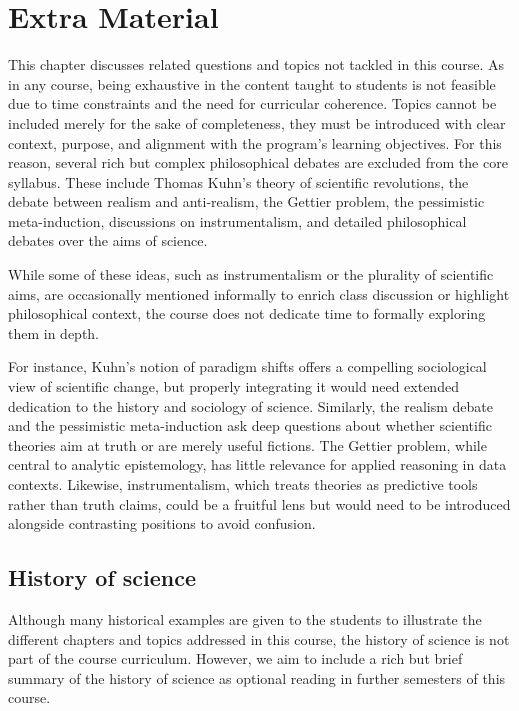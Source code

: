 \documentclass[
  12pt,
]{book}
\begin{document}
\chapter{Extra Material}\label{wont-fix}

This chapter discusses related questions and topics not tackled in this course. As in any course, being exhaustive in the content taught to students is not feasible due to time constraints and the need for curricular coherence. Topics cannot be included merely for the sake of completeness, they must be introduced with clear context, purpose, and alignment with the program's learning objectives. For this reason, several rich but complex philosophical debates are excluded from the core syllabus. These include Thomas Kuhn's theory of scientific revolutions, the debate between realism and anti-realism, the Gettier problem, the pessimistic meta-induction, discussions on instrumentalism, and detailed philosophical debates over the aims of science.

While some of these ideas, such as instrumentalism or the plurality of scientific aims, are occasionally mentioned informally to enrich class discussion or highlight philosophical context, the course does not dedicate time to formally exploring them in depth.

For instance, Kuhn's notion of paradigm shifts offers a compelling sociological view of scientific change, but properly integrating it would need extended dedication to the history and sociology of science. Similarly, the realism debate and the pessimistic meta-induction ask deep questions about whether scientific theories aim at truth or are merely useful fictions. The Gettier problem, while central to analytic epistemology, has little relevance for applied reasoning in data contexts. Likewise, instrumentalism, which treats theories as predictive tools rather than truth claims, could be a fruitful lens but would need to be introduced alongside contrasting positions to avoid confusion.

\section{History of science}\label{history-of-science}

Although many historical examples are given to the students to illustrate the different chapters and topics addressed in this course, the history of science is not part of the course curriculum. However, we aim to include a rich but brief summary of the history of science as optional reading in further semesters of this course.
\end{document}
